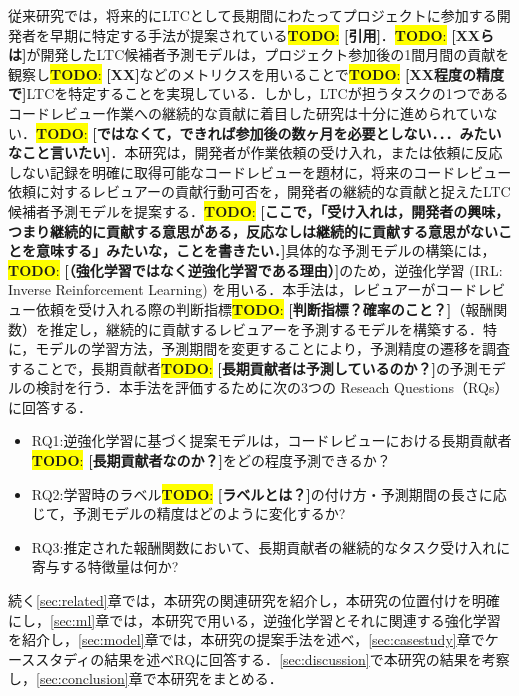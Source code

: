 \documentclass[submit,techrep,noauthor]{ipsj}
\newcommand{\todo}[1]{\colorbox{yellow}{{\bf TODO}:}{\color{red} {\textbf{[#1]}}}}
\begin{document}



従来研究では，将来的にLTCとして長期間にわたってプロジェクトに参加する開発者を早期に特定する手法が提案されている\todo{引用}．\todo{XXらは}が開発したLTC候補者予測モデルは，プロジェクト参加後の1間月間の貢献を観察し\todo{XX}などのメトリクスを用いることで\todo{XX程度の精度で}LTCを特定することを実現している．しかし，LTCが担うタスクの1つであるコードレビュー作業への継続的な貢献に着目した研究は十分に進められていない．\todo{ではなくて，できれば参加後の数ヶ月を必要としない．．．みたいなこと言いたい}．本研究は，開発者が作業依頼の受け入れ，または依頼に反応しない記録を明確に取得可能なコードレビューを題材に，将来のコードレビュー依頼に対するレビュアーの貢献行動可否を，開発者の継続的な貢献と捉えたLTC候補者予測モデルを提案する．\todo{ここで，「受け入れは，開発者の興味，つまり継続的に貢献する意思がある，反応なしは継続的に貢献する意思がないことを意味する」みたいな，ことを書きたい．}具体的な予測モデルの構築には，\todo{（強化学習ではなく逆強化学習である理由）}のため，逆強化学習 (IRL: Inverse Reinforcement Learning) を用いる．本手法は，レビュアーがコードレビュー依頼を受け入れる際の判断指標\todo{判断指標？確率のこと？}（報酬関数）を推定し，継続的に貢献するレビュアーを予測するモデルを構築する．特に，モデルの学習方法，予測期間を変更することにより，予測精度の遷移を調査することで，長期貢献者\todo{長期貢献者は予測しているのか？}の予測モデルの検討を行う．本手法を評価するために次の3つの Reseach Questions（RQs）に回答する．
\begin{itemize}
    \item RQ1:逆強化学習に基づく提案モデルは，コードレビューにおける長期貢献者\todo{長期貢献者なのか？}をどの程度予測できるか？
    \item RQ2:学習時のラベル\todo{ラベルとは？}の付け方・予測期間の長さに応じて，予測モデルの精度はどのように変化するか?
    \item RQ3:推定された報酬関数において、長期貢献者の継続的なタスク受け入れに寄与する特徴量は何か?
\end{itemize}


続く\ref{sec:related}章では，本研究の関連研究を紹介し，本研究の位置付けを明確にし，\ref{sec:ml}章では，本研究で用いる，逆強化学習とそれに関連する強化学習を紹介し，\ref{sec:model}章では，本研究の提案手法を述べ，\ref{sec:casestudy}章でケーススタディの結果を述べRQに回答する．\ref{sec:discussion}で本研究の結果を考察し，\ref{sec:conclusion}章で本研究をまとめる．
\end{document}
